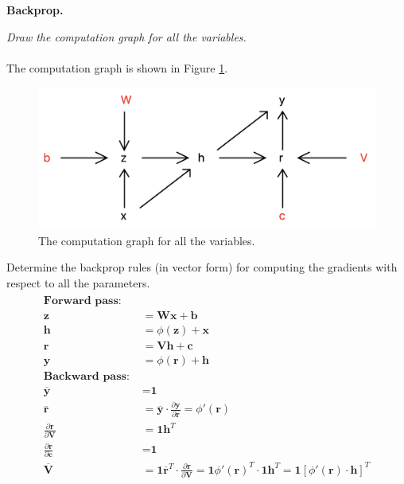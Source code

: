 \documentclass{myhw}
\begin{document}
\begin{homeworkProblem}
\textbf{Backprop.}
\begin{homeworkSection}
\emph{Draw the computation graph for all the variables.} \\
\\
The computation graph is shown in Figure \ref{fig:q2.1}.
\begin{figure}[h]
  \centering
  \includegraphics[width=.5\textwidth]{q2.1.png} 
  \caption{The computation graph for all the variables. }
  \label{fig:q2.1}
\end{figure}
\end{homeworkSection}
\begin{homeworkSection}
Determine the backprop rules (in vector form) for computing the gradients with respect to all the parameters. 
\\
\begin{gather*}
\begin{aligned}
\textbf{Forward pass: \ \ \ \ } \\
\textbf{z} &= \textbf{Wx} + \textbf{b} \\
\textbf{h} &= \phi(\textbf{z}) + \textbf{x} \\
\textbf{r} &= \textbf{Vh} + \textbf{c} \\
\textbf{y} &= \phi(\textbf{r}) + \textbf{h} \\
\textbf{Backward pass: \ \ \ \ } \\
\overline{\textbf{y}} &= \textbf{1} \\
\overline{\textbf{r}} &= \overline{\textbf{y}} \cdot \frac{\partial\textbf{y}}{\partial\textbf{r}} = \phi'(\textbf{r}) \\
\frac{\partial{\textbf{r}}}{\partial{\textbf{V}}} &= \textbf{1}\textbf{h}^T \\
\frac{\partial{\textbf{r}}}{\partial{\textbf{c}}} &= \textbf{1} \\
\overline{\textbf{V}} &= \textbf{1} \overline{\textbf{r}}^T \cdot \frac{\partial{\textbf{r}}}{\partial{\textbf{V}}} = \textbf{1} \phi'(\textbf{r})^T \cdot \textbf{1}\textbf{h}^T = \textbf{1} [\phi'(\textbf{r}) \cdot \textbf{h}]^T\\

\end{aligned}
\end{gather*}
\end{homeworkSection}
\end{homeworkProblem}
\end{document}
